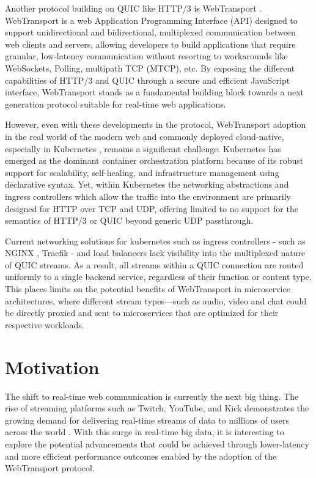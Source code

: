Another protocol building on QUIC like HTTP/3 is WebTransport \cite{webtransport-draft}. WebTransport is a web Application Programming Interface (API) designed to support unidirectional and bidirectional, multiplexed communication between web clients and servers, allowing developers to build applications that require granular, low-latency communication without resorting to workarounds like WebSockets, Polling, multipath TCP (MTCP), etc. By exposing the different capabilities of HTTP/3 and QUIC through a secure and efficient JavaScript interface, WebTransport stands as a fundamental building block towards a next generation protocol suitable for real-time web applications.

However, even with these developments in the protocol, WebTransport adoption in the real world of the modern web and commonly deployed cloud-native, especially in Kubernetes \cite{kubernetes-docs}, remains a significant challenge. Kubernetes has emerged as the dominant container orchestration platform because of its robust support for scalability, self-healing, and infrastructure management using declarative syntax. Yet, within Kubernetes the networking abstractions and ingress controllers which allow the traffic into the environment are primarily designed for HTTP over TCP and UDP, offering limited to no support for the semantics of HTTP/3 or QUIC beyond generic UDP passthrough.

Current networking solutions for kubernetes such as ingress controllers - such as NGINX \cite{nginx-ingress-docs}, Traefik - and load balancers lack visibility into the multiplexed nature of QUIC streams. As a result, all streams within a QUIC connection are routed uniformly to a single backend service, regardless of their function or content type. This places limits on the potential benefits of WebTransport in microservice architectures, where different stream types—such as audio, video and chat could be directly proxied and sent to microservices that are optimized for their respective workloads.




\section{Motivation}

The shift to real-time web communication is currently the next big thing. The rise of streaming platforms such as Twitch, YouTube, and Kick demonstrates the growing demand for delivering real-time streams of data to millions of users across the world \cite{kreps2011}. With this surge in real-time big data, it is interesting to explore the potential advancements that could be achieved through lower-latency and more efficient performance outcomes enabled by the adoption of the WebTransport protocol.

